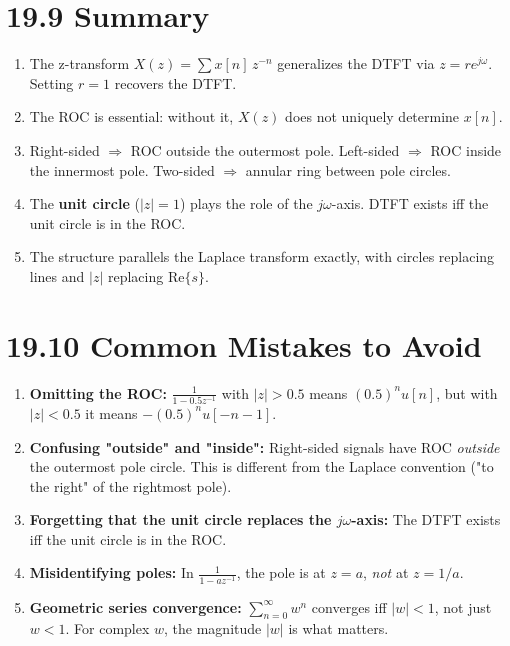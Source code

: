 \documentclass[11pt]{article}
\begin{document}
\section*{19.9 Summary}

\begin{enumerate}
  \item The z-transform $X(z) = \sum x[n]\, z^{-n}$ generalizes the DTFT via $z = r e^{j\omega}$. Setting $r = 1$ recovers the DTFT.
  \item The ROC is essential: without it, $X(z)$ does not uniquely determine $x[n]$.
  \item Right-sided $\Rightarrow$ ROC outside the outermost pole. Left-sided $\Rightarrow$ ROC inside the innermost pole. Two-sided $\Rightarrow$ annular ring between pole circles.
  \item The \textbf{unit circle} ($|z| = 1$) plays the role of the $j\omega$-axis. DTFT exists iff the unit circle is in the ROC.
  \item The structure parallels the Laplace transform exactly, with circles replacing lines and $|z|$ replacing $\mathrm{Re}\{s\}$.
\end{enumerate}

\section*{19.10 Common Mistakes to Avoid}

\begin{enumerate}
  \item \textbf{Omitting the ROC:} $\frac{1}{1 - 0.5 z^{-1}}$ with $|z| > 0.5$ means $(0.5)^n u[n]$, but with $|z| < 0.5$ it means $-(0.5)^n u[-n-1]$.
  \item \textbf{Confusing "outside" and "inside":} Right-sided signals have ROC \textit{outside} the outermost pole circle. This is different from the Laplace convention ("to the right" of the rightmost pole).
  \item \textbf{Forgetting that the unit circle replaces the $j\omega$-axis:} The DTFT exists iff the unit circle is in the ROC.
  \item \textbf{Misidentifying poles:} In $\frac{1}{1 - az^{-1}}$, the pole is at $z = a$, \textit{not} at $z = 1/a$.
  \item \textbf{Geometric series convergence:} $\sum_{n=0}^{\infty} w^n$ converges iff $|w| < 1$, not just $w < 1$. For complex $w$, the magnitude $|w|$ is what matters.
\end{enumerate}
\end{document}
